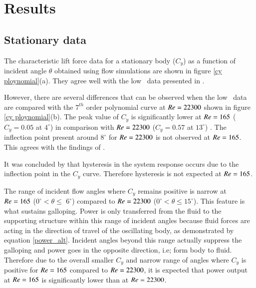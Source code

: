 \section{Results}
\label{sec:results}

\subsection{Stationary data}

The characteristic lift force data for a stationary body ($C_y$) as a function of incident angle $\theta$ obtained using flow simulations are shown in figure \ref{cy ploynomial}(a). They agree well with the low \reynoldsnumber\ data presented in \citet{Joly2012}.

However, there are several differences that can be observed when the low \reynoldsnumber\ data are compared with the $7^{th}$ order polynomial curve at $Re=22300$ shown in figure \ref{cy ploynomial}(b). The peak value of $C_y$ is  significantly lower at $Re=165$ ($C_y=0.05$ at $4^\circ$) in comparison with $Re=22300$ ($C_y=0.57$ at $13^\circ$) . The inflection point present around $8^\circ$ for $Re=22300$ is not observed at $Re=165$. This agrees with the findings of \cite{Luo2003}. 

It was concluded by \cite{Luo2003} that hysteresis in the system response occurs due to the inflection point in the $C_y$ curve. Therefore hysteresis is not expected at $Re=165$.

The range of incident flow angles where $C_y$ remains positive is narrow at $Re=165$ ($0^\circ <\theta \leq$ $6^\circ$) compared to $Re=22300$ ($0^\circ <\theta \leq 15^\circ$). This feature is what sustains galloping. Power is only transferred from the fluid to the supporting structure within this range of incident angles because fluid forces are acting in the direction of travel of the oscillating body, as demonstrated by equation \ref{power_alt}. Incident angles beyond this range actually suppress the galloping and power goes in the opposite direction, i.e; form body to fluid. Therefore due to the overall smaller $C_y$ and narrow range of angles where $C_y$ is positive for $Re=165$ compared to $Re=22300$, it is expected that power output at $Re=165$ is significantly lower than at $Re=22300$. 



